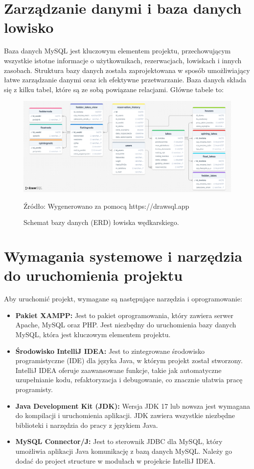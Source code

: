\section{Zarządzanie danymi i baza danych lowisko}
\label{sec:baza_danych_nowe}
Baza danych MySQL jest kluczowym elementem projektu, przechowującym wszystkie istotne informacje o użytkownikach, rezerwacjach, łowiskach i innych zasobach. Struktura bazy danych została zaprojektowana w sposób umożliwiający łatwe zarządzanie danymi oraz ich efektywne przetwarzanie.
Baza danych składa się z kilku tabel, które są ze sobą powiązane relacjami. Główne tabele to:

\begin{figure}[H]
    \centering
    \includegraphics[width=\linewidth]{figures/dbd.eps}
    \caption{Schemat bazy danych (ERD) łowiska wędkarskiego.}
    \label{fig:erddiagram}
    \small{Źródło: Wygenerowano za pomocą https://drawsql.app}
\end{figure}
\clearpage

\section{Wymagania systemowe i narzędzia do uruchomienia projektu}
Aby uruchomić projekt, wymagane są następujące narzędzia i oprogramowanie:
\begin{itemize}
    \item \textbf{Pakiet XAMPP:} Jest to pakiet oprogramowania, który zawiera serwer Apache, MySQL oraz PHP. Jest niezbędny do uruchomienia bazy danych MySQL, która jest kluczowym elementem projektu.
    \item \textbf{Środowisko IntelliJ IDEA:} Jest to zintegrowane środowisko programistyczne (IDE) dla języka Java, w którym projekt został stworzony. IntelliJ IDEA oferuje zaawansowane funkcje, takie jak automatyczne uzupełnianie kodu, refaktoryzacja i debugowanie, co znacznie ułatwia pracę programisty. 
    \item \textbf{Java Development Kit (JDK):} Wersja JDK 17 lub nowsza jest wymagana do kompilacji i uruchomienia aplikacji. JDK zawiera wszystkie niezbędne biblioteki i narzędzia do pracy z językiem Java.
    \item \textbf{MySQL Connector/J:} Jest to sterownik JDBC dla MySQL, który umożliwia aplikacji Java komunikację z bazą danych MySQL. Należy go dodać do project structure w modułach w projekcie IntelliJ IDEA.
\end{itemize}

    


